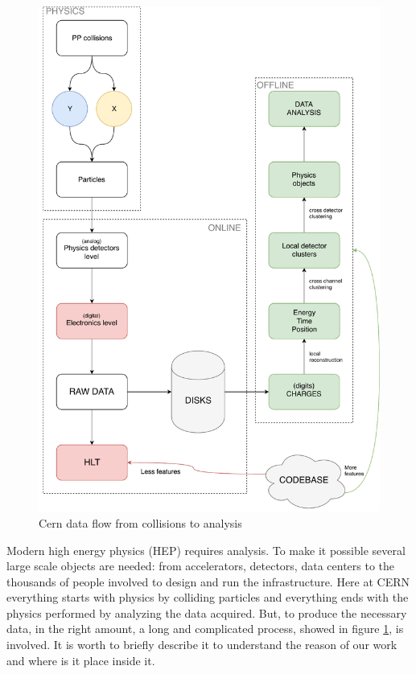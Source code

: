 \begin{figure}[ht]
  \includegraphics[height=\textheight]{img/dataflow}
  \caption{Cern data flow from collisions to analysis}
  \label{img:dataflow}
\end{figure}
Modern high energy physics (HEP) requires analysis. To make it possible several large scale objects are needed: from accelerators, detectors, data centers to the thousands of people involved to design and run the infrastructure. Here at CERN everything starts with physics by colliding particles and everything ends with the physics performed by analyzing the data acquired. But, to produce the necessary data, in the right amount, a long and complicated process, showed in figure \ref{img:dataflow}, is involved. It is worth to briefly describe it to understand the reason of our work and where is it place inside it. \\
